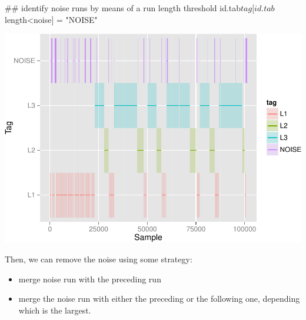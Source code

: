 \documentclass[]{article}
\newenvironment{Shaded}{\begin{snugshade}}{\end{snugshade}}
\newcommand{\StringTok}[1]{\textcolor[rgb]{0.31,0.60,0.02}{{#1}}}
\newcommand{\NormalTok}[1]{{#1}}
\begin{document}
\begin{Shaded}
\begin{Highlighting}[]
  \NormalTok{## identify noise runs by means of a run length threshold}
  \NormalTok{id.tab$tag[id.tab$length<noise] =}\StringTok{ "NOISE"}
\end{Highlighting}
\end{Shaded}

\includegraphics{AnalysisProcedure_files/figure-latex/runs_with_noise-1.pdf}

Then, we can remove the noise using some strategy:

\begin{itemize}
\itemsep1pt\parskip0pt
\item
  merge noise run with the preceding run
\item
  merge the noise run with either the preceding or the following one,
  depending which is the largest.
\end{itemize}
\end{document}
